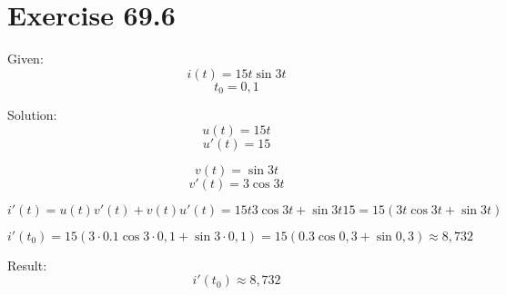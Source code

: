 \documentclass[a4paper, 10pt]{scrartcl}
\begin{document}
\section{Exercise 69.6}

Given:
\[i(t) = 15t\sin{3t}\]
\[t_{0} = 0,1\]

Solution:
\[u(t) = 15t\]
\[u'(t) = 15\]

\[v(t) = \sin{3t}\]
\[v'(t) = 3\cos{3t}\]

\[i'(t) = u(t)v'(t) + v(t)u'(t) = 15t3\cos{3t} + \sin{3t}15 = 15(3t\cos{3t} + \sin{3t})\]

\[i'(t_{0}) = 15(3\cdot 0.1\cos{3\cdot 0,1} + \sin{3 \cdot 0,1}) =
              15(0.3\cos{0,3} + \sin{0,3}) \approx 8,732\]

Result:
\[i'(t_{0}) \approx 8,732\]
\end{document}
